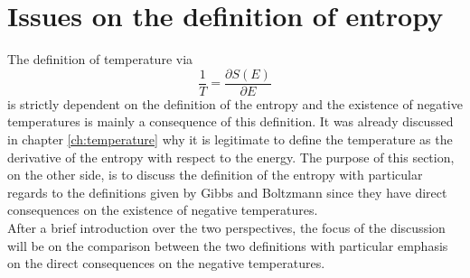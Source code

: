 \chapter{Issues on the definition of entropy}
\label{ch:entropy}
The definition of temperature via
\begin{equation*}
    \frac{1}{T} = \frac{\partial S(E)}{\partial E}
\end{equation*}
is strictly dependent on the definition of the entropy and the existence of negative temperatures is mainly a consequence of this definition. 
It was already discussed in chapter \ref{ch:temperature} why it is legitimate to define the temperature as the derivative of the entropy with respect to the energy. The purpose of this section, on the other side,
is to discuss the definition of the entropy with particular regards to the definitions given by Gibbs and Boltzmann since they have direct consequences on the existence of negative temperatures. \\
After a brief introduction over the two perspectives, the focus of the discussion will be on the comparison between the two definitions with particular emphasis on the direct consequences on the negative temperatures.

